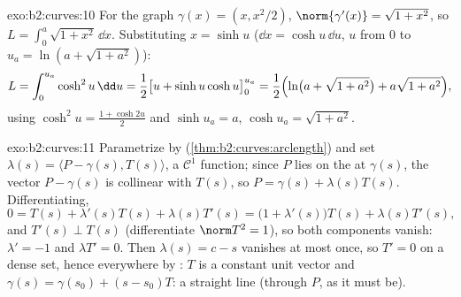 \begin{solution}{exo:b2:curves:10}
For the graph $\gamma(x) = (x, x^2/2)$, $\norm{\gamma'(x)} =
\sqrt{1 + x^2}$, so $L = \int_0^a\sqrt{1+x^2}\,\dd x$.
Substituting $x = \sinh u$ ($\dd x = \cosh u\,\dd u$, $u$ from
$0$ to $u_a = \ln(a + \sqrt{1+a^2})$):
\[
L = \int_0^{u_a}\cosh^2 u\,\dd u
= \frac12\bigl[u + \sinh u\cosh u\bigr]_0^{u_a}
= \frac12\Bigl(\ln\bigl(a + \sqrt{1+a^2}\bigr) +
a\sqrt{1+a^2}\Bigr),
\]
using $\cosh^2 u = \frac{1 + \cosh 2u}2$ and $\sinh u_a = a$,
$\cosh u_a = \sqrt{1 + a^2}$.
\end{solution}

\begin{solution}{exo:b2:curves:11}
Parametrize by 
(\cref{thm:b2:curves:arclength}) and set $\lambda(s) =
\langle P - \gamma(s), T(s)\rangle$, a $\mathcal C^1$
function; since $P$ lies on the  at $\gamma(s)$,
the vector $P - \gamma(s)$ is collinear with $T(s)$, so $P =
\gamma(s) + \lambda(s)T(s)$. Differentiating,
\[
0 = T(s) + \lambda'(s)T(s) + \lambda(s)T'(s)
= \bigl(1 + \lambda'(s)\bigr)T(s) + \lambda(s)T'(s),
\]
and $T'(s) \perp T(s)$ (differentiate $\norm T^2 = 1$), so
both components vanish: $\lambda' = -1$ and $\lambda T' = 0$.
Then $\lambda(s) = c - s$ vanishes at most once, so $T' = 0$
on a dense set, hence everywhere by : $T$ is a
constant unit vector and $\gamma(s) = \gamma(s_0) + (s -
s_0)T$: a straight line (through $P$, as it must be).
\end{solution}

